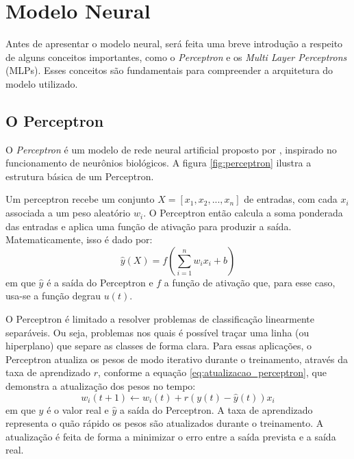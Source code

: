 \newpage
\section{Modelo Neural}
Antes de apresentar o modelo neural, será feita uma breve introdução a respeito de alguns conceitos importantes,
como o \textit{Perceptron} e os \textit{Multi Layer Perceptrons} (MLPs). Esses conceitos são fundamentais para compreender
a arquitetura do modelo utilizado.

\subsection{O Perceptron}
O \textit{Perceptron} é um modelo de rede neural artificial proposto por , inspirado no
funcionamento de neurônios biológicos. A figura \ref{fig:perceptron} ilustra a estrutura básica de um Perceptron.

Um perceptron recebe um conjunto $ X = [x_1, x_2, ..., x_n] $ de entradas,
com cada $ x_i $ associada a um peso aleatório $ w_i $. O Perceptron então calcula a soma ponderada das entradas e aplica uma 
função de ativação para produzir a saída. Matematicamente, isso é dado por:
\begin{equation}
\label{eq:perceptron}
\hat{y}(X) = f\left(\sum_{i=1}^{n} w_i x_i + b\right)
\end{equation}
em que $ \hat{y} $ é a saída do Perceptron e $ f $ a função de ativação que, para esse caso, usa-se a função degrau $ u(t) $.

\begin{figure}[!ht]
	{}
	{}
\end{figure}

O Perceptron é limitado a resolver problemas de classificação linearmente separáveis. Ou seja, problemas nos quais é
possível traçar uma linha (ou hiperplano) que separe as classes de forma clara. Para essas aplicações, o Perceptron
atualiza os pesos de modo iterativo durante o treinamento, através da taxa de aprendizado $ r $, conforme a equação 
\ref{eq:atualizacao_perceptron}, que demonstra a atualização dos pesos no tempo:
\begin{equation}
\label{eq:atualizacao_perceptron}
w_i(t+1) \leftarrow w_i(t) + r (y(t) - \hat{y}(t)) x_i
\end{equation}
em que $ y $ é o valor real e $ \hat{y} $ a saída do Perceptron. A taxa de aprendizado representa o quão rápido
os pesos são atualizados durante o treinamento. A atualização é feita de forma a minimizar o erro entre a saída prevista
e a saída real.


